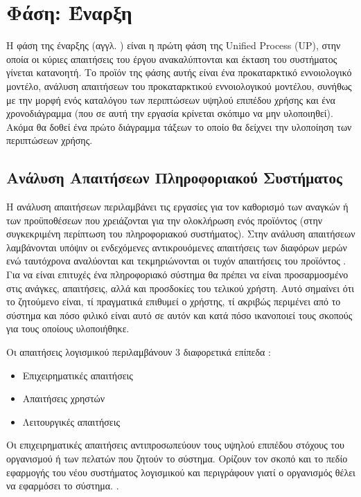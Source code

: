 \documentclass{assignment}
\begin{document}
\section{Φάση: Έναρξη}
\label{section:inception}

Η φάση της έναρξης (αγγλ. ) είναι η πρώτη φάση της Unified Process (UP), στην οποία οι κύριες απαιτήσεις του έργου ανακαλύπτονται και έκταση του συστήματος γίνεται κατανοητή. Το προϊόν της φάσης αυτής είναι ένα προκαταρκτικό εννοιολογικό μοντέλο, ανάλυση απαιτήσεων του προκαταρκτικού εννοιολογικού μοντέλου, συνήθως με την μορφή ενός καταλόγου των περιπτώσεων υψηλού επιπέδου χρήσης και ένα χρονοδιάγραμμα (που σε αυτή την εργασία κρίνεται σκόπιμο να μην υλοποιηθεί)\cite{wazlawick2014object}. Ακόμα θα δοθεί ένα πρώτο διάγραμμα τάξεων το οποίο θα δείχνει την υλοποίηση των περιπτώσεων χρήσης.

\subsection{Ανάλυση Απαιτήσεων Πληροφοριακού Συστήματος}

Η ανάλυση απαιτήσεων περιλαμβάνει τις εργασίες για τον καθορισμό των αναγκών ή των προϋποθέσεων που χρειάζονται για την ολοκλήρωση ενός προϊόντος (στην συγκεκριμένη περίπτωση του πληροφοριακού συστήματος). Στην ανάλυση απαιτήσεων λαμβάνονται υπόψιν οι ενδεχόμενες αντικρουόμενες απαιτήσεις των διαφόρων μερών ενώ ταυτόχρονα αναλύονται και τεκμηριώνονται οι τυχόν απαιτήσεις του προϊόντος \cite{wiki:requirement_analysis}. Για να είναι επιτυχές ένα πληροφοριακό σύστημα θα πρέπει να είναι προσαρμοσμένο στις ανάγκες, απαιτήσεις, αλλά και προσδοκίες του τελικού χρήστη. Αυτό σημαίνει ότι το ζητούμενο είναι, τί πραγματικά επιθυμεί ο χρήστης, τί ακριβώς περιμένει από το σύστημα και πόσο φιλικό είναι αυτό σε αυτόν και κατά πόσο ικανοποιεί τους σκοπούς για τους οποίους υλοποιήθηκε.  

Οι απαιτήσεις λογισμικού περιλαμβάνουν 3 διαφορετικά επίπεδα \cite{triadis}:

\begin{itemize}
\item Επιχειρηματικές απαιτήσεις
\item Απαιτήσεις χρηστών
\item Λειτουργικές απαιτήσεις
\end{itemize}

Οι επιχειρηματικές απαιτήσεις αντιπροσωπεύουν τους υψηλού επιπέδου στόχους του οργανισμού ή των πελατών που ζητούν το σύστημα. Ορίζουν τον σκοπό και το πεδίο εφαρμογής του νέου συστήματος λογισμικού και περιγράφουν γιατί ο οργανισμός θέλει να εφαρμόσει το σύστημα.  \cite{triadis}.
\end{document}
